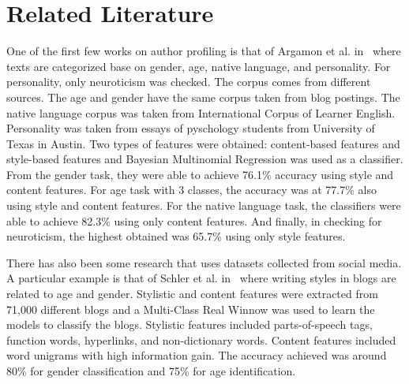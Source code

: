 \documentclass[a4paper]{llncs}
\begin{document}
\section{Related Literature}
One of the first few works on author profiling is that of Argamon et al. in~\cite{argamon2009automatically} where texts are categorized base on gender, age, native language, and personality. For personality, only neuroticism was checked. The corpus comes from different sources. The age and gender have the same corpus taken from blog postings. The native language corpus was taken from International Corpus of Learner English. Personality was taken from essays of pyschology students from University of Texas in Austin. Two types of features were obtained: content-based features and style-based features and Bayesian Multinomial Regression was used as a classifier. From the gender task, they were able to achieve 76.1\% accuracy using style and content features. For age task with 3 classes, the accuracy was at 77.7\% also using style and content features. For the native language task, the classifiers were able to achieve 82.3\% using only content features. And finally, in checking for neuroticism, the highest obtained was 65.7\% using only style features. 

There has also been some research that uses datasets collected from social media. A particular example is that of Schler et al. in~\cite{schler2006effects} where writing styles in blogs are related to age and gender. Stylistic and content features were extracted from 71,000 different blogs and a Multi-Class Real Winnow was used to learn the models to classify the blogs. Stylistic features included parts-of-speech tags, function words, hyperlinks, and non-dictionary words. Content features included word unigrams with high information gain. The accuracy achieved was around 80\% for gender classification and 75\% for age identification.  
\end{document}
